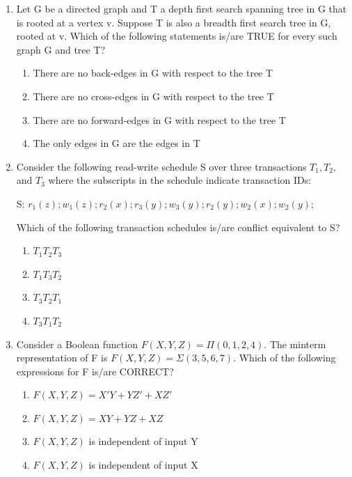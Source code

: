 \documentclass[a4paper, 11pt]{article}
\begin{document}
\begin{enumerate}
    \item Let G be a directed graph and T a depth first search  spanning tree in G that is rooted at a vertex v. Suppose T is also a breadth first search  tree in G, rooted at v. Which of the following statements is/are TRUE for every such graph G and tree T?
    \begin{enumerate}
        \item There are no back-edges in G with respect to the tree T
        \item There are no cross-edges in G with respect to the tree T
        \item There are no forward-edges in G with respect to the tree T
        \item The only edges in G are the edges in T
    \end{enumerate}
    \hfill{}

    \item Consider the following read-write schedule S over three transactions $T_1, T_2,$ and $T_3$ where the subscripts in the schedule indicate transaction IDs:
    
    S: $r_1(z); w_1(z); r_2(x); r_3(y); w_3(y); r_2(y); w_2(x); w_2(y);$
    
    Which of the following transaction schedules is/are conflict equivalent to S?

    \begin{enumerate}
        \item $T_1 T_2 T_3$
        \item $T_1 T_3 T_2$
        \item $T_3 T_2 T_1$
        \item $T_3 T_1 T_2$
    \end{enumerate}
    \hfill{}

    \item Consider a Boolean function $F(X,Y,Z) = \Pi(0,1,2,4)$. The minterm representation of F is $F(X,Y,Z) = \Sigma(3,5,6,7)$. Which of the following expressions for F is/are CORRECT?

    \begin{enumerate}
        \item $F(X,Y,Z) = X'Y+YZ'+XZ'$
        \item $F(X,Y,Z) = XY+YZ+XZ$
        \item $F(X,Y,Z)$ is independent of input Y
        \item $F(X,Y,Z)$ is independent of input X
    \end{enumerate}
    \hfill{}


\end{enumerate}
\end{document}
